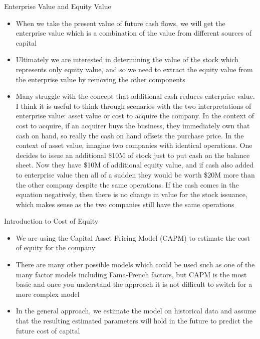 \documentclass[]{article}
\begin{document}
\begin{section}{Enterprise Value and Equity Value}
\begin{itemize}
\item When we take the present value of future cash flows, we will get the enterprise value which is a combination of the value from different sources of capital
\item Ultimately we are interested in determining the value of the stock which represents only equity value, and so we need to extract the equity value from the enterprise value by removing the other components
\item Many struggle with the concept that additional cash reduces enterprise value. I think it is useful to think through scenarios with the two interpretations of enterprise value: asset value or cost to acquire the company. In the context of cost to acquire, if an acquirer buys the business, they immediately own that cash on hand, so really the cash on hand offsets the purchase price. In the context of asset value, imagine two companies with identical operations. One decides to issue an additional \$10M of stock just to put cash on the balance sheet. Now they have \$10M of additional equity value, and if cash also added to enterprise value then all of a sudden they would be worth \$20M more than the other company despite the same operations. If the cash comes in the equation negatively, then there is no change in value for the stock issuance, which makes sense as the two companies still have the same operations
\end{itemize}
\end{section}
\begin{section}{Introduction to Cost of Equity}
\begin{itemize}
\item We are using the Capital Asset Pricing Model (CAPM) to estimate the cost of equity for the company
\item There are many other possible models which could be used such as one of the many factor models including Fama-French factors, but CAPM is the most basic and once you understand the approach it is not difficult to switch for a more complex model
\item In the general approach, we estimate the model on historical data and assume that the resulting estimated parameters will hold in the future to predict the future cost of capital
\end{itemize}
\end{section}
\end{document}
